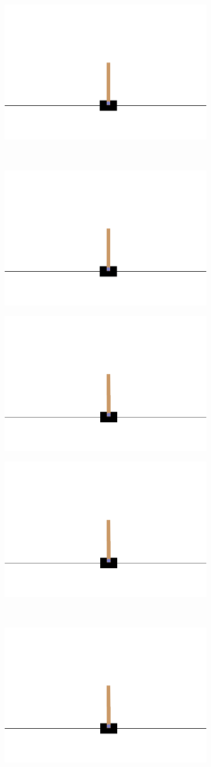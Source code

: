 \begin{figure}[H]
	\hfill
	\begin{subfigure}
		\centering
		\includegraphics[width=0.3\linewidth]{Images/frames/RL/6.png}
	\end{subfigure}
	\\
	\begin{subfigure}
		\centering
		\includegraphics[width=0.3\linewidth]{Images/frames/RL/7.png}
	\end{subfigure}
	\hfill
	\begin{subfigure}
		\centering
		\includegraphics[width=0.3\linewidth]{Images/frames/RL/8.png}
	\end{subfigure}
	\hfill
	\begin{subfigure}
		\centering
		\includegraphics[width=0.3\linewidth]{Images/frames/RL/9.png}
	\end{subfigure}
	\\
	\begin{subfigure}
		\centering
		\includegraphics[width=0.3\linewidth]{Images/frames/RL/10.png}
	\end{subfigure}

\end{figure}
